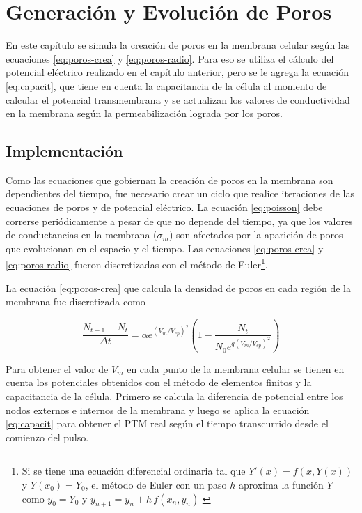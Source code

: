 \chapter{Generación y Evolución de Poros} \label{chap:poros}

En este capítulo se simula la creación de poros en la membrana celular según las ecuaciones \ref{eq:poros-crea} y \ref{eq:poros-radio}. Para eso se utiliza el cálculo del potencial eléctrico realizado en el capítulo anterior, pero se le agrega la ecuación \ref{eq:capacit}, que tiene en cuenta la capacitancia de la célula al momento de calcular el potencial transmembrana y se actualizan los valores de conductividad en la membrana según la permeabilización lograda por los poros.

\section{Implementación}

Como las ecuaciones que gobiernan la creación de poros en la membrana son dependientes del tiempo, fue necesario crear un ciclo que realice iteraciones de las ecuaciones de poros y de potencial eléctrico. La ecuación \ref{eq:poisson} debe correrse periódicamente a pesar de que no depende del tiempo, ya que los valores de conductancias en la membrana ($\sigma_{m}$) son afectados por la aparición de poros que evolucionan en el espacio y el tiempo. Las ecuaciones \ref{eq:poros-crea} y \ref{eq:poros-radio} fueron discretizadas con el método de Euler\footnote{Si se tiene una ecuación diferencial ordinaria tal que $Y'(x) = f(x, Y(x))$ y $Y(x_0) = Y_0$, el método de Euler con un paso $h$ aproxima la función $Y$ como $y_0 = Y_0$ y $y_{n+1} = y_n + h\,f(x_n, y_n)$ \cite{kendall}}.

La ecuación \ref{eq:poros-crea} que calcula la densidad de poros en cada región de la membrana fue discretizada como


\begin{equation} \label{eq:poros-crea-disc}
	\frac{N_{t+1} - N_{t}}{\Delta t} = \alpha e^{(V_m/V_{ep})^2} \left( 1 - \frac{N_{t}}{N_0 e^{q \left(V_m / V_{ep} \right) ^2}} \right)
\end{equation}

Para obtener el valor de $V_m$ en cada punto de la membrana celular se tienen en cuenta los potenciales obtenidos con el método de elementos finitos y la capacitancia de la célula. Primero se calcula la diferencia de potencial entre los nodos externos e internos de la membrana y luego se aplica la ecuación \ref{eq:capacit} para obtener el PTM real según el tiempo transcurrido desde el comienzo del pulso.

